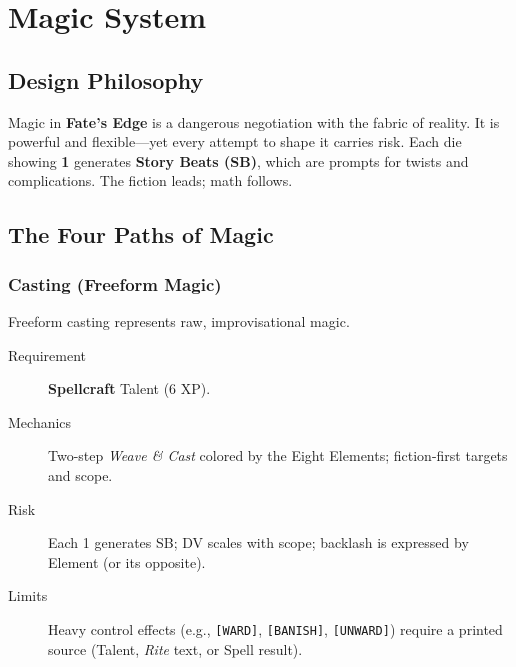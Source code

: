
\chapter{Magic System}\label{chap:magic_system}

\section{Design Philosophy}\label{sec:magic_philosophy}

Magic in \textbf{Fate's Edge} is a dangerous negotiation with the fabric of reality. It is powerful and flexible---yet every attempt to shape it carries risk. Each die showing \textbf{1} generates \textbf{Story Beats (SB)}, which are prompts for twists and complications. The fiction leads; math follows.

\section{The Four Paths of Magic}\label{sec:four_paths}

\subsection{Casting (Freeform Magic)}\label{subsec:freeform_casting}

Freeform casting represents raw, improvisational magic.

\begin{description}
    \item[Requirement] \textbf{Spellcraft} Talent (6 XP).
    \item[Mechanics] Two-step \emph{Weave \& Cast} colored by the Eight Elements; fiction-first targets and scope.
    \item[Risk] Each 1 generates SB; DV scales with scope; backlash is expressed by Element (or its opposite).
    \item[Limits] Heavy control effects (e.g., \texttt{[WARD]}, \texttt{[BANISH]}, \texttt{[UNWARD]}) require a printed source (Talent, \emph{Rite} text, or Spell result).
\end{description}

